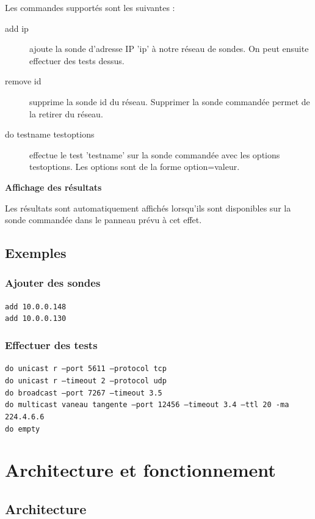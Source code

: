 \documentclass[a4paper,11pt]{article}
\begin{document}
Les commandes supportés sont les suivantes :
\begin{description}
\item[add ip] ajoute la sonde d'adresse IP 'ip' à notre réseau de sondes. On peut ensuite effectuer des tests dessus.
\item[remove id] supprime la sonde id du réseau. Supprimer la sonde commandée permet de la retirer du réseau.
\item[do testname testoptions] effectue le test 'testname' sur la sonde commandée avec les options testoptions. Les options sont de la forme option=valeur.
\end{description}
\vspace{2ex}
\textbf{Affichage des résultats}

Les résultats sont automatiquement affichés lorsqu'ils sont disponibles sur la sonde commandée dans le panneau prévu à cet effet.


\subsection{Exemples}
\subsubsection{Ajouter des sondes}
\texttt{add 10.0.0.148}\\
\indent\texttt{add 10.0.0.130}

\subsubsection{Effectuer des tests}
\texttt{do unicast r --port 5611 --protocol tcp}\\
\indent\texttt{do unicast r --timeout 2 --protocol udp}\\
\indent\texttt{do broadcast --port 7267 --timeout 3.5 }\\
\indent\texttt{do multicast vaneau tangente --port 12456 --timeout 3.4 --ttl 20 -ma 224.4.6.6}\\
\indent\texttt{do empty}

\section{Architecture et fonctionnement}


\subsection{Architecture}
\end{document}
